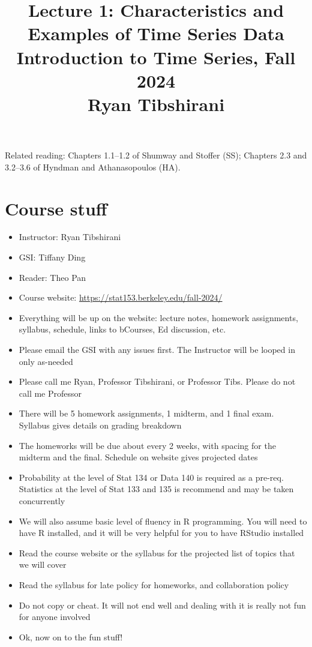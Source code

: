 \documentclass{article}
\title{Lecture 1: Characteristics and Examples of Time Series Data \\ \smallskip  
\large Introduction to Time Series, Fall 2024 \\ \smallskip
Ryan Tibshirani}
\date{}
\begin{document}
\maketitle
\RaggedRight
\vspace{-50pt}

Related reading: Chapters 1.1--1.2 of Shumway and Stoffer (SS); Chapters 2.3 and   
3.2--3.6 of Hyndman and Athanasopoulos (HA). 

\section{Course stuff}

\begin{itemize}
\item Instructor: Ryan Tibshirani
\item GSI: Tiffany Ding
\item Reader: Theo Pan
\item Course website:
  \url{https://stat153.berkeley.edu/fall-2024/}

\item Everything will be up on the website: lecture notes, homework assignments,
  syllabus, schedule, links to bCourses, Ed discussion, etc.

\item Please email the GSI with any issues first. The Instructor will be looped
  in only as-needed 

\item Please call me Ryan, Professor Tibshirani, or Professor Tibs. Please do
  not call me Professor  

\item There will be 5 homework assignments, 1 midterm, and 1 final
  exam. Syllabus gives details on grading breakdown

\item The homeworks will be due about every 2 weeks, with spacing for the
  midterm and the final. Schedule on website gives projected dates

\item Probability at the level of Stat 134 or Data 140 is required as a
  pre-req. Statistics at the level of Stat 133 and 135 is recommend and may be
  taken concurrently

\item We will also assume basic level of fluency in R programming. You will need
  to have R installed, and it will be very helpful for you to have RStudio
  installed 

\item Read the course website or the syllabus for the projected list of topics
  that we will cover

\item Read the syllabus for late policy for homeworks, and collaboration policy 

\item Do not copy or cheat. It will not end well and dealing with it is really
  not fun for anyone involved

\item Ok, now on to the fun stuff!
\end{itemize}
\end{document}
